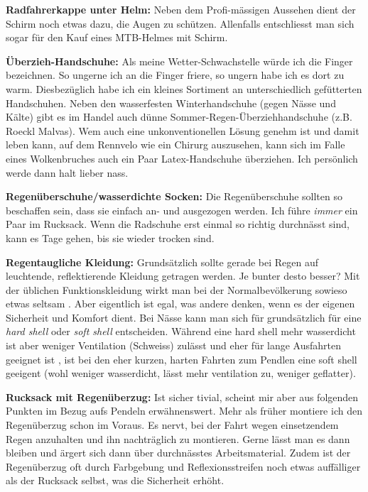 \textbf{Radfahrerkappe unter Helm:}
Neben dem Profi-mässigen Aussehen dient der Schirm noch etwas dazu, die Augen zu schützen.
Allenfalls entschliesst man sich sogar für den Kauf eines MTB-Helmes mit Schirm.

\textbf{Überzieh-Handschuhe:}
Als meine Wetter-Schwachstelle würde ich die Finger bezeichnen.
So ungerne ich an die Finger friere, so ungern habe ich es dort zu warm.
Diesbezüglich habe ich ein kleines Sortiment an unterschiedlich gefütterten Handschuhen.
Neben den wasserfesten Winterhandschuhe (gegen Nässe und Kälte) gibt es im Handel auch dünne Sommer-Regen-Überziehhandschuhe
(z.B. Roeckl Malvas).
Wem auch eine unkonventionellen Lösung genehm ist und damit leben kann, auf dem Rennvelo wie ein Chirurg auszusehen,
kann sich im Falle eines Wolkenbruches auch ein Paar Latex-Handschuhe überziehen.
Ich persönlich werde dann halt lieber nass.

\textbf{Regenüberschuhe/wasserdichte Socken:}
Die Regenüberschuhe sollten so beschaffen sein, dass sie einfach an- und ausgezogen werden.
Ich führe \emph{immer} ein Paar im Rucksack.
Wenn die Radschuhe erst einmal so richtig durchnässt sind,
kann es Tage gehen, bis sie wieder trocken sind.

\textbf{Regentaugliche Kleidung:}
Grundsätzlich sollte gerade bei Regen auf leuchtende, reflektierende Kleidung getragen werden.
Je bunter desto besser?
Mit der üblichen Funktionskleidung wirkt man bei der Normalbevölkerung sowieso etwas seltsam \cite{Rasche2016albern}.
Aber eigentlich ist egal, was andere denken, wenn es der eigenen Sicherheit und Komfort dient.
Bei Nässe kann man sich für grundsätzlich für eine \textsl{hard shell} oder \textsl{soft shell} entscheiden.
Während eine hard shell mehr wasserdicht ist aber weniger Ventilation (Schweiss) zulässt und eher für lange Ausfahrten geeignet ist \cite{gcn2015rain},
ist bei den eher kurzen, harten Fahrten zum Pendlen eine soft shell geeigent (wohl weniger wasserdicht, lässt mehr ventilation zu, weniger geflatter).

\textbf{Rucksack mit Regenüberzug:}
Ist sicher tivial, scheint mir aber aus folgenden Punkten im Bezug aufs Pendeln erwähnenswert.
Mehr als früher montiere ich den Regenüberzug schon im Voraus.
Es nervt, bei der Fahrt wegen einsetzendem Regen anzuhalten und ihn nachträglich zu montieren.
Gerne lässt man es dann bleiben und ärgert sich dann über durchnässtes Arbeitsmaterial.
Zudem ist der Regenüberzug oft durch Farbgebung und Reflexionsstreifen noch etwas auffälliger als der Rucksack selbst,
was die Sicherheit erhöht.

